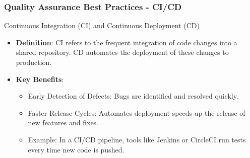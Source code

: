 \documentclass{beamer}
\begin{document}
\begin{frame}[fragile]
    \frametitle{Quality Assurance Best Practices - CI/CD}
    \begin{block}{Continuous Integration (CI) and Continuous Deployment (CD)}
        \begin{itemize}
            \item \textbf{Definition}: CI refers to the frequent integration of code changes into a shared repository. CD automates the deployment of these changes to production.
            \item \textbf{Key Benefits}:
            \begin{itemize}
                \item Early Detection of Defects: Bugs are identified and resolved quickly.
                \item Faster Release Cycles: Automates deployment speeds up the release of new features and fixes.
                \item Example: In a CI/CD pipeline, tools like Jenkins or CircleCI run tests every time new code is pushed.
            \end{itemize}
        \end{itemize}
    \end{block}
\end{frame}
\end{document}
